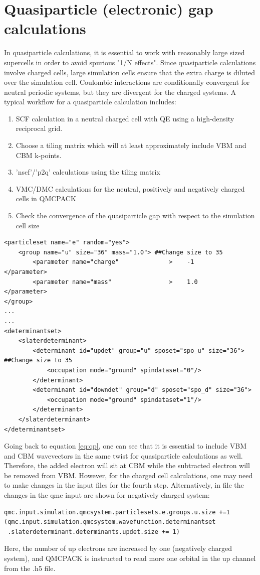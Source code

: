 \section{Quasiparticle (electronic) gap calculations}\label{sec:lab_ex_qp}
In quasiparticle calculations, it is essential to work with reasonably large sized supercells in order to avoid spurious "1/N effects". 
Since quasiparticle calculations involve charged cells, large simulation cells ensure that the extra charge is diluted over the simulation cell. Coulombic interactions are conditionally convergent for neutral periodic systems, but they are divergent for the charged systems. 
A typical workflow for a quasiparticle calculation includes:
\begin{enumerate}
	\item SCF calculation in a neutral charged cell with QE using a high-density reciprocal grid.
	\item Choose a tiling matrix which will at least approximately include VBM and CBM k-points. 
	\item 'nscf'/'p2q' calculations using the tiling matrix 
	\item VMC/DMC calculations for the neutral, positively and negatively charged cells in QMCPACK
	\item Check the convergence of the quasiparticle gap with respect to the simulation cell size
\end{enumerate}
\begin{lstlisting}[style=QMCPXML]
<particleset name="e" random="yes">
	<group name="u" size="36" mass="1.0"> ##Change size to 35
		<parameter name="charge"              >    -1                    </parameter>
		<parameter name="mass"                >    1.0                   </parameter>
</group>
...
...
<determinantset>
	<slaterdeterminant>
		<determinant id="updet" group="u" sposet="spo_u" size="36"> ##Change size to 35
		    <occupation mode="ground" spindataset="0"/>	
		</determinant>
		<determinant id="downdet" group="d" sposet="spo_d" size="36">
		    <occupation mode="ground" spindataset="1"/>	
		</determinant>
	</slaterdeterminant>
</determinantset>
\end{lstlisting}
Going back to equation \ref{eq:qp}, one can see that it is essential to include VBM and CBM wavevectors in the same twist for quasiparticle calculations as well. 
Therefore, the added electron will sit at CBM while the subtracted electron will be removed from VBM. 
However, for the charged cell calculations, one may need to make changes in the input files for the fourth step.  Alternatively, in  file the changes in the qmc input are shown for negatively charged system:
\begin{lstlisting}[style=Python]
qmc.input.simulation.qmcsystem.particlesets.e.groups.u.size +=1
(qmc.input.simulation.qmcsystem.wavefunction.determinantset
 .slaterdeterminant.determinants.updet.size += 1)
\end{lstlisting}
Here, the number of up electrons are increased by one (negatively charged system), and QMCPACK is instructed to read more one orbital in the up channel from the .h5 file. 

